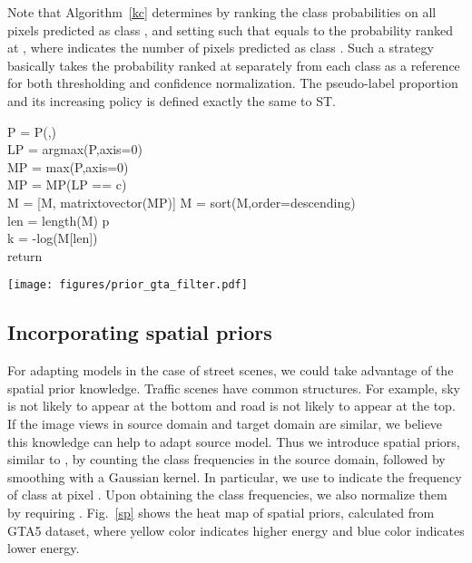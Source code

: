 \documentclass[runningheads]{llncs}
\begin{document}
Note that Algorithm~\ref{kc} determines  by ranking the class  probabilities on all pixels predicted as class , and setting  such that  equals to the probability ranked at , where  indicates the number of pixels predicted as class . Such a strategy basically takes the probability ranked at  separately from each class as a reference for both thresholding and confidence normalization. The pseudo-label proportion  and its increasing policy is defined exactly the same to ST.

\begin{algorithm}
	
	\Output{}
	{ P = P(,) \\
		LP = argmax(P,axis=0) \\
		MP = max(P,axis=0) \\
		{
			MP = MP(LP == c) \\
			M = [M, matrixtovector(MP)]
		}
	}
	{
		M = sort(M,order=descending)\\
		len = length(M)  p \\
		k = -log(M[len]) \\
	}
	{
		return 
	}
	\caption{Determination of  in CBST}
	\label{kc}
\end{algorithm}

\begin{figure*}[!b]
\centering
\texttt{[image: figures/prior\_gta\_filter.pdf]}
\caption{Visualization of class-wise spatial priors on GTA5.}
\label{sp}
\end{figure*}

\subsection{Incorporating spatial priors}
For adapting models in the case of street scenes, we could take advantage of the spatial prior knowledge. Traffic scenes have common structures. For example, sky is not likely to appear at the bottom and road is not likely to appear at the top. If the image views in source domain and target domain are similar, we believe this knowledge can help to adapt source model. Thus we introduce spatial priors, similar to \cite{silberman2011indoor}, by counting the class frequencies in the source domain, followed by smoothing with a  Gaussian kernel. In particular, we use  to indicate the frequency of class  at pixel . Upon obtaining the class frequencies, we also normalize them by requiring . Fig.~\ref{sp} shows the heat map of spatial priors, calculated from GTA5 dataset, where yellow color indicates higher energy and blue color indicates lower energy.
\end{document}
